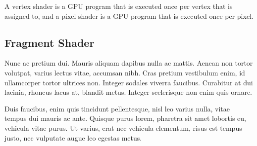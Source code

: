 A vertex shader is a GPU program that is executed once per vertex that is assigned to, and a pixel shader is a GPU program that is executed once per pixel.

\subsection{Fragment Shader}



Nunc ac pretium dui. Mauris aliquam dapibus nulla ac mattis. Aenean non tortor volutpat, varius lectus vitae, accumsan nibh. Cras pretium vestibulum enim, id ullamcorper tortor ultrices non. Integer sodales viverra faucibus. Curabitur at dui lacinia, rhoncus lacus at, blandit metus. Integer scelerisque non enim quis ornare.

\lipsum[13]

	\begin{table}[h!]	
		\centering
	\end{table}

Duis faucibus, enim quis tincidunt pellentesque, nisl leo varius nulla, vitae tempus dui mauris ac ante. Quisque purus lorem, pharetra sit amet lobortis eu, vehicula vitae purus. Ut varius, erat nec vehicula elementum, risus est tempus justo, nec vulputate augue leo egestas metus.

\lipsum[14]

